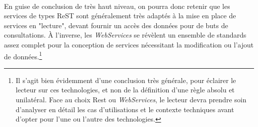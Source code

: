 {  \paragraph{} En guise de conclusion de très haut niveau, on pourra donc retenir que les services
  de types ReST sont généralement très adaptés à la mise en place de services en "lecture", devant
  fournir un accès des données pour de buts de consultations. À l'inverse, les \textit{WebServices}
  se révèlent un ensemble de standards assez complet pour la conception de services nécessitant
  la modification ou l'ajout de données.\footnote{Il s'agit bien évidemment d'une conclusion très
  générale, pour éclairer le lecteur sur ces technologies, et non de la définition d'une règle
  absolu et unilatéral. Face au choix Rest ou \textit{WebServices}, le lecteur devra prendre soin
  d'analyser en détail les cas d'utilisations et le contexte techniques avant d'opter pour l'une ou
  l'autre des technologies.}
}


